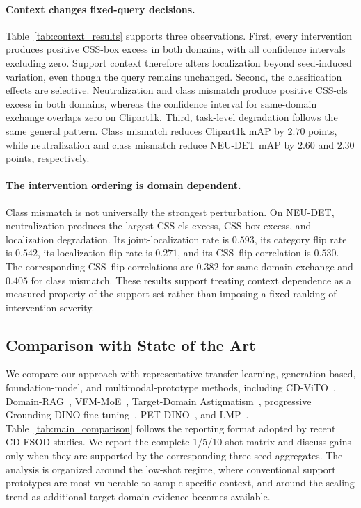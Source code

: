 \paragraph{Context changes fixed-query decisions.}
Table~\ref{tab:context_results} supports three observations. First, every intervention produces positive CSS-box excess in both domains, with all confidence intervals excluding zero. Support context therefore alters localization beyond seed-induced variation, even though the query remains unchanged. Second, the classification effects are selective. Neutralization and class mismatch produce positive CSS-cls excess in both domains, whereas the confidence interval for same-domain exchange overlaps zero on Clipart1k. Third, task-level degradation follows the same general pattern. Class mismatch reduces Clipart1k mAP by $2.70$ points, while neutralization and class mismatch reduce NEU-DET mAP by $2.60$ and $2.30$ points, respectively.

\paragraph{The intervention ordering is domain dependent.}
Class mismatch is not universally the strongest perturbation. On NEU-DET, neutralization produces the largest CSS-cls excess, CSS-box excess, and localization degradation. Its joint-localization rate is $0.593$, its category flip rate is $0.542$, its localization flip rate is $0.271$, and its CSS--flip correlation is $0.530$. The corresponding CSS--flip correlations are $0.382$ for same-domain exchange and $0.405$ for class mismatch. These results support treating context dependence as a measured property of the support set rather than imposing a fixed ranking of intervention severity.

\subsection{Comparison with State of the Art}
\label{sec:main_results}

We compare our approach with representative transfer-learning, generation-based, foundation-model, and multimodal-prototype methods, including CD-ViTO~\cite{cdvito}, Domain-RAG~\cite{domainrag}, VFM-MoE~\cite{vfmmoe}, Target-Domain Astigmatism~\cite{astigmatism}, progressive Grounding DINO fine-tuning~\cite{yu2026}, PET-DINO~\cite{petdino}, and LMP~\cite{lmp}. Table~\ref{tab:main_comparison} follows the reporting format adopted by recent CD-FSOD studies. We report the complete 1/5/10-shot matrix and discuss gains only when they are supported by the corresponding three-seed aggregates. The analysis is organized around the low-shot regime, where conventional support prototypes are most vulnerable to sample-specific context, and around the scaling trend as additional target-domain evidence becomes available.

